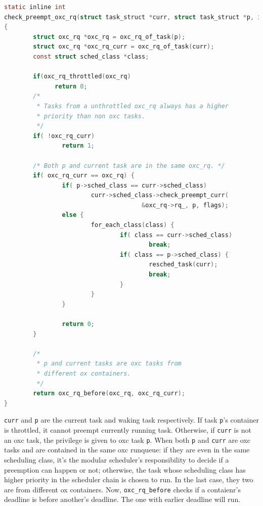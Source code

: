 \begin{lstlisting}[language=C, 
		caption={The preemption check for an oxc task},
		label={lst:check_preempt_curr_oxc}]
static inline int
check_preempt_oxc_rq(struct task_struct *curr, struct task_struct *p, int flags)
{
        struct oxc_rq *oxc_rq = oxc_rq_of_task(p);
        struct oxc_rq *oxc_rq_curr = oxc_rq_of_task(curr);
        const struct sched_class *class;

        if(oxc_rq_throttled(oxc_rq)
              return 0;
        /* 
         * Tasks from a unthrottled oxc_rq always has a higher 
         * priority than non oxc tasks.
         */
        if( !oxc_rq_curr)
                return 1;

        /* Both p and current task are in the same oxc_rq. */
        if( oxc_rq_curr == oxc_rq) {
                if( p->sched_class == curr->sched_class) 
                        curr->sched_class->check_preempt_curr(
                                      &oxc_rq->rq_, p, flags);
                else {
                        for_each_class(class) {
                                if( class == curr->sched_class)
                                        break;
                                if( class == p->sched_class) {
                                        resched_task(curr);
                                        break;
                                }
                        }
                }

                return 0;
        }

        /* 
         * p and current tasks are oxc tasks from 
         * different ox containers. 
         */
        return oxc_rq_before(oxc_rq, oxc_rq_curr);
}
\end{lstlisting}

\texttt{curr} and \texttt{p} are the current task and waking task 
respectively. If task \texttt{p}'s container is throttled, it cannot 
preempt currently running task. Otherwise, if \texttt{curr} is not an 
oxc task, the privilege is given to oxc task \texttt{p}.
When both \texttt{p} and \texttt{curr} are oxc tasks and are contained 
in the same oxc runqueue: if they are even in the same scheduling class, 
it's the modular scheduler's responsibility to decide if a preemption 
can happen or not; otherwise, the task whose scheduling class has higher 
priority in the scheduler chain is chosen to run. In the last case, they 
two are from different ox containers. Now, \texttt{oxc\_rq\_before} 
checks if a contaienr's deadline is before another's deadline. The one 
with earlier deadline will run. 

